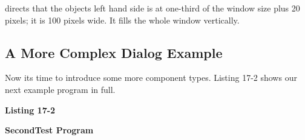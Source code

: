 
\noindent
directs that the object{\textquotesingle}s left hand side is at
one-third of the window size plus 20 pixels; it is 100 pixels wide. It
fills the whole window vertically.

\subsection{A More Complex Dialog Example}

Now it{\textquotesingle}s time to introduce some more component types.
Listing 17-2 shows our next example program in full.

\bigskip

{\sffamily\bfseries
Listing 17-2}

{\sffamily\bfseries
SecondTest Program}

